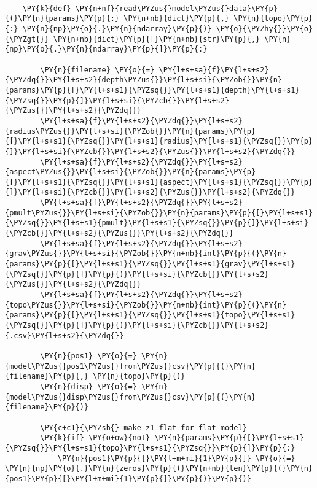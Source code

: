 \begin{tcolorbox}[breakable, size=fbox, boxrule=1pt, pad at break*=1mm,colback=cellbackground, colframe=cellborder]
\begin{Verbatim}[commandchars=\\\{\}]
    
    \PY{k}{def} \PY{n+nf}{read\PYZus{}model\PYZus{}data}\PY{p}{(}\PY{n}{params}\PY{p}{:} \PY{n+nb}{dict}\PY{p}{,} \PY{n}{topo}\PY{p}{:} \PY{n}{np}\PY{o}{.}\PY{n}{ndarray}\PY{p}{)} \PY{o}{\PYZhy{}}\PY{o}{\PYZgt{}} \PY{n+nb}{dict}\PY{p}{[}\PY{n+nb}{str}\PY{p}{,} \PY{n}{np}\PY{o}{.}\PY{n}{ndarray}\PY{p}{]}\PY{p}{:}
    
        \PY{n}{filename} \PY{o}{=} \PY{l+s+sa}{f}\PY{l+s+s2}{\PYZdq{}}\PY{l+s+s2}{depth\PYZus{}}\PY{l+s+si}{\PYZob{}}\PY{n}{params}\PY{p}{[}\PY{l+s+s1}{\PYZsq{}}\PY{l+s+s1}{depth}\PY{l+s+s1}{\PYZsq{}}\PY{p}{]}\PY{l+s+si}{\PYZcb{}}\PY{l+s+s2}{\PYZus{}}\PY{l+s+s2}{\PYZdq{}} 
        \PY{l+s+sa}{f}\PY{l+s+s2}{\PYZdq{}}\PY{l+s+s2}{radius\PYZus{}}\PY{l+s+si}{\PYZob{}}\PY{n}{params}\PY{p}{[}\PY{l+s+s1}{\PYZsq{}}\PY{l+s+s1}{radius}\PY{l+s+s1}{\PYZsq{}}\PY{p}{]}\PY{l+s+si}{\PYZcb{}}\PY{l+s+s2}{\PYZus{}}\PY{l+s+s2}{\PYZdq{}}
        \PY{l+s+sa}{f}\PY{l+s+s2}{\PYZdq{}}\PY{l+s+s2}{aspect\PYZus{}}\PY{l+s+si}{\PYZob{}}\PY{n}{params}\PY{p}{[}\PY{l+s+s1}{\PYZsq{}}\PY{l+s+s1}{aspect}\PY{l+s+s1}{\PYZsq{}}\PY{p}{]}\PY{l+s+si}{\PYZcb{}}\PY{l+s+s2}{\PYZus{}}\PY{l+s+s2}{\PYZdq{}}
        \PY{l+s+sa}{f}\PY{l+s+s2}{\PYZdq{}}\PY{l+s+s2}{pmult\PYZus{}}\PY{l+s+si}{\PYZob{}}\PY{n}{params}\PY{p}{[}\PY{l+s+s1}{\PYZsq{}}\PY{l+s+s1}{pmult}\PY{l+s+s1}{\PYZsq{}}\PY{p}{]}\PY{l+s+si}{\PYZcb{}}\PY{l+s+s2}{\PYZus{}}\PY{l+s+s2}{\PYZdq{}}
        \PY{l+s+sa}{f}\PY{l+s+s2}{\PYZdq{}}\PY{l+s+s2}{grav\PYZus{}}\PY{l+s+si}{\PYZob{}}\PY{n+nb}{int}\PY{p}{(}\PY{n}{params}\PY{p}{[}\PY{l+s+s1}{\PYZsq{}}\PY{l+s+s1}{grav}\PY{l+s+s1}{\PYZsq{}}\PY{p}{]}\PY{p}{)}\PY{l+s+si}{\PYZcb{}}\PY{l+s+s2}{\PYZus{}}\PY{l+s+s2}{\PYZdq{}}
        \PY{l+s+sa}{f}\PY{l+s+s2}{\PYZdq{}}\PY{l+s+s2}{topo\PYZus{}}\PY{l+s+si}{\PYZob{}}\PY{n+nb}{int}\PY{p}{(}\PY{n}{params}\PY{p}{[}\PY{l+s+s1}{\PYZsq{}}\PY{l+s+s1}{topo}\PY{l+s+s1}{\PYZsq{}}\PY{p}{]}\PY{p}{)}\PY{l+s+si}{\PYZcb{}}\PY{l+s+s2}{.csv}\PY{l+s+s2}{\PYZdq{}}
    
        \PY{n}{pos1} \PY{o}{=} \PY{n}{model\PYZus{}pos1\PYZus{}from\PYZus{}csv}\PY{p}{(}\PY{n}{filename}\PY{p}{,} \PY{n}{topo}\PY{p}{)}
        \PY{n}{disp} \PY{o}{=} \PY{n}{model\PYZus{}disp\PYZus{}from\PYZus{}csv}\PY{p}{(}\PY{n}{filename}\PY{p}{)}
    
        \PY{c+c1}{\PYZsh{} make z1 flat for flat model}
        \PY{k}{if} \PY{o+ow}{not} \PY{n}{params}\PY{p}{[}\PY{l+s+s1}{\PYZsq{}}\PY{l+s+s1}{topo}\PY{l+s+s1}{\PYZsq{}}\PY{p}{]}\PY{p}{:}
            \PY{n}{pos1}\PY{p}{[}\PY{l+m+mi}{1}\PY{p}{]} \PY{o}{=} \PY{n}{np}\PY{o}{.}\PY{n}{zeros}\PY{p}{(}\PY{n+nb}{len}\PY{p}{(}\PY{n}{pos1}\PY{p}{[}\PY{l+m+mi}{1}\PY{p}{]}\PY{p}{)}\PY{p}{)}
    

\end{Verbatim}
\end{tcolorbox}
